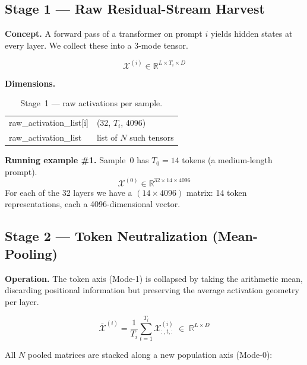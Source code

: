 \documentclass[11pt,a4paper]{article}
\begin{document}
\subsection{Stage 1 — Raw Residual-Stream Harvest}

\textbf{Concept.}
A forward pass of a transformer on prompt $i$ yields hidden states at every layer.
We collect these into a 3-mode tensor.

\[
\mathcal{X}^{(i)} \in \mathbb{R}^{L \times T_i \times D}
\]

\noindent
\textbf{Dimensions.}

\begin{table}[H]
\centering
\begin{tabular}{>{\ttfamily}l>{\ttfamily}l}
\toprule
\multicolumn{1}{c}{\textbf{Tensor}} & \multicolumn{1}{c}{\textbf{Shape}} \\
\midrule
raw\_activation\_list[i]  & (32, $T_i$, 4096) \\
raw\_activation\_list     & list of $N$ such tensors \\
\bottomrule
\end{tabular}
\caption{Stage~1 — raw activations per sample.}
\end{table}

\noindent
\textbf{Running example \#1.}
Sample~0 has $T_0 = 14$ tokens (a medium-length prompt).
\[
\mathcal{X}^{(0)} \in \mathbb{R}^{32 \times 14 \times 4096}
\]
For each of the 32 layers we have a $(14 \times 4096)$ matrix: 14 token
representations, each a 4096-dimensional vector.

\subsection{Stage 2 — Token Neutralization (Mean-Pooling)}

\textbf{Operation.}
The token axis (Mode-1) is collapsed by taking the arithmetic mean,
discarding positional information but preserving the average activation
geometry per layer.

\[
\overline{\mathcal{X}}^{(i)}
   = \frac{1}{T_i} \sum_{t=1}^{T_i} \mathcal{X}^{(i)}_{:,t,:}
   \;\in\; \mathbb{R}^{L \times D}
\]

All $N$ pooled matrices are stacked along a new population axis (Mode-0):
\end{document}
